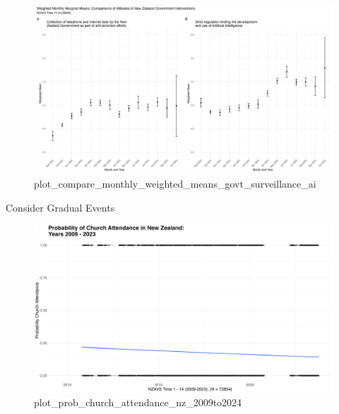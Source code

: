\documentclass[
  ignorenonframetext,
  aspectratio=169,
]{beamer}
\begin{document}
\begin{frame}
\begin{figure}[H]

{\centering \includegraphics{plot_compare_monthly_weighted_means_govt_surveillance_ai.png}

}

\caption{plot\_compare\_monthly\_weighted\_means\_govt\_surveillance\_ai}

\end{figure}%
\end{frame}

\begin{frame}
\Large \centering Consider Gradual Events
\end{frame}

\begin{frame}
\begin{figure}[H]

{\centering \includegraphics{plot_prob_church_attendance_nz_2009to2024.png}

}

\caption{plot\_prob\_church\_attendance\_nz\_2009to2024}

\end{figure}%
\end{frame}
\end{document}
